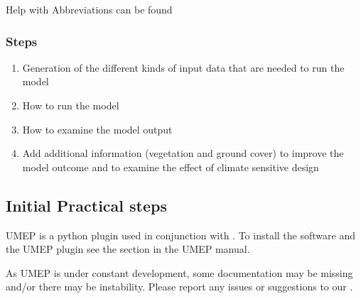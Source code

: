 \documentclass[letterpaper,10pt,english]{sphinxmanual}
\begin{document}
Help with Abbreviations can be found {\hyperref[\detokenize{Abbreviations:abbreviations}]{}}


\subsubsection{Steps}
\label{\detokenize{Tutorials/IntroductionToSolweig:steps}}\begin{enumerate}
\item {} 
Generation of the different kinds of input data that are needed to
run the model

\item {} 
How to run the model

\item {} 
How to examine the model output

\item {} 
Add additional information (vegetation and ground cover) to improve
the model outcome and to examine the effect of climate sensitive
design

\end{enumerate}


\subsection{Initial Practical steps}
\label{\detokenize{Tutorials/IntroductionToSolweig:initial-practical-steps}}
UMEP is a python plugin used in conjunction with
. To install the software and the UMEP
plugin see the {\hyperref[\detokenize{Getting_Started:getting-started}]{}}
section in the UMEP manual.

As UMEP is under constant development, some documentation may be missing
and/or there may be instability. Please report any issues or suggestions
to our .
\end{document}
